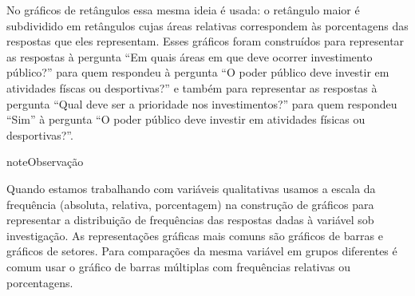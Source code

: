 No gráficos de retângulos essa mesma ideia é usada: o retângulo maior é subdividido em retângulos cujas áreas relativas correspondem às porcentagens das respostas que eles representam. Esses gráficos foram construídos para representar as respostas à pergunta ``Em quais áreas em que deve ocorrer investimento público?'' para quem respondeu  à pergunta ``O poder público deve investir em atividades físcas ou desportivas?'' e também para representar as respostas à pergunta ``Qual deve ser a prioridade nos investimentos?'' para quem respondeu ``Sim'' à pergunta ``O poder público deve investir em atividades físicas ou desportivas?''.

\begin{sphinxadmonition}{note}{Observação}

Quando estamos trabalhando com variáveis qualitativas usamos a escala da frequência (absoluta, relativa, porcentagem)  na construção de gráficos para representar a distribuição de frequências das respostas dadas à variável sob investigação. As representações gráficas mais comuns são gráficos de barras e gráficos de setores. Para comparações da mesma variável em grupos diferentes é comum usar o gráfico de barras múltiplas com frequências relativas ou porcentagens.
\end{sphinxadmonition}


